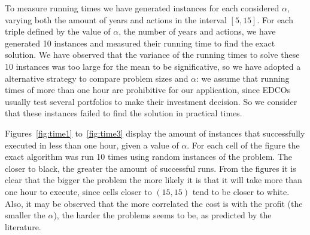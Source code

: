 To measure running times we have generated instances for each considered $\alpha$, varying both the amount of years and actions
in the interval $[5,15]$. For each triple defined by the value of $\alpha$, the number of years and actions,
we have generated 10 instances and measured their running time to find the exact solution. 
We have observed that the variance of the running times to solve these 10 instances was too large
for the mean to be significative, so we have adopted a alternative strategy to compare problem sizes
and $\alpha$:
we assume that running times of more than one hour are prohibitive for our application, since
EDCOs usually test several portfolios to make their investment decision. So we consider that
these instances failed to find the solution in practical times.

Figures~\ref{fig:time1} to~\ref{fig:time3} display the amount of instances that successfully executed in less than one hour,
given a value of $\alpha$. For each cell of the figure the exact algorithm was run 10 times using random instances of the problem.
The closer to black, the greater the amount of successful runs. 
From the figures it is clear that the bigger the problem the more likely it is that it will take more than one hour to execute, 
since cells closer to $(15,15)$ tend to be closer to white.
Also, it may be observed that the more
correlated the cost is with the profit (the smaller the $\alpha$),
the harder the problems seems to be, as predicted by the literature.


